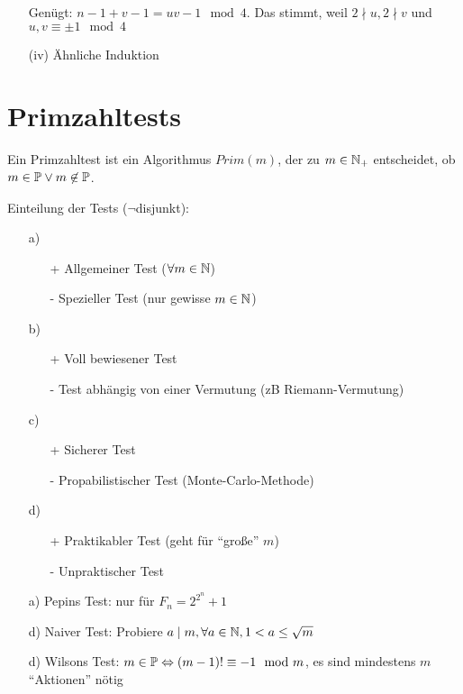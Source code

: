 \documentclass[a4paper,twoside,DIV15,BCOR12mm]{scrbook}
\begin{document}
\begin{beweis}
\begin{itemize}
    Genügt: $n - 1 + v - 1 = uv-1 \mod 4$. Das stimmt, weil $2 \nmid u, 2 \nmid v$ und $u,v \equiv \pm 1 \mod 4$
    \item[(iv)] Ähnliche Induktion
     \end{itemize}
\end{beweis}

\chapter{Primzahltests }


Ein Primzahltest ist ein Algorithmus $Prim(m)$, der zu $m \in \mathbb{N}_+$ entscheidet, ob $m \in \mathbb{P} \vee m \not\in \mathbb{P}$.

Einteilung der Tests ($\neg$disjunkt):
\begin{itemize}
 \item[a)] 
  \begin{itemize}
   \item[+] Allgemeiner Test ($\forall m \in \mathbb{N}$)
   \item[-] Spezieller Test (nur gewisse $m \in \mathbb{N}$)
  \end{itemize}
 \item[b)] 
  \begin{itemize}
   \item[+] Voll bewiesener Test
   \item[-] Test abhängig von einer Vermutung (zB Riemann-Vermutung)
  \end{itemize}
 \item[c)] 
  \begin{itemize}
   \item[+] Sicherer Test
   \item[-] Propabilistischer Test (Monte-Carlo-Methode)
  \end{itemize}
 \item[d)] 
  \begin{itemize}
   \item[+] Praktikabler Test (geht für "`große"' $m$)
   \item[-] Unpraktischer Test
  \end{itemize}
\end{itemize}

\begin{beispiel}
 \begin{itemize}
  \item[a)] Pepins Test: nur für $F_n = 2^{2^n} + 1$
  \item[d)] Naiver Test: Probiere $a \mid m, \forall a \in \mathbb{N}, 1 < a \le \sqrt{m}$
  \item[d)] Wilsons Test: $m \in \mathbb{P} \Leftrightarrow (m-1)! \equiv -1 \mod m$, es sind mindestens $m$ "`Aktionen"' nötig
 \end{itemize}
\end{beispiel}
\end{document}
